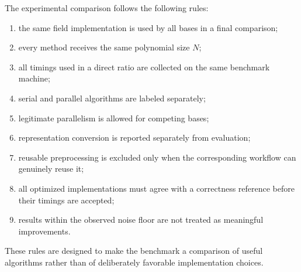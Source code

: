 The experimental comparison follows the following rules:

\begin{enumerate}
    \item the same field implementation is used by all bases in a final
    comparison;
    \item every method receives the same polynomial size \(N\);
    \item all timings used in a direct ratio are collected on the same
    benchmark machine;
    \item serial and parallel algorithms are labeled separately;
    \item legitimate parallelism is allowed for competing bases;
    \item representation conversion is reported separately from evaluation;
    \item reusable preprocessing is excluded only when the corresponding
    workflow can genuinely reuse it;
    \item all optimized implementations must agree with a correctness
    reference before their timings are accepted;
    \item results within the observed noise floor are not treated as
    meaningful improvements.
\end{enumerate}

These rules are designed to make the benchmark a comparison of useful
algorithms rather than of deliberately favorable implementation choices.
